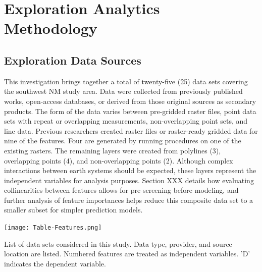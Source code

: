 \chapter{Exploration Analytics Methodology}\label{ch3:expl_methods}

\section{Exploration Data Sources}\label{ch3:expl_data_src}

This investigation brings together a total of twenty-five (25) data sets covering the southwest NM study area. Data were collected from previously published works, open-access databases, or derived from those original sources as secondary products. The form of the data varies between pre-gridded raster files, point data sets with repeat or overlapping measurements, non-overlapping point sets, and line data. Previous researchers created raster files or raster-ready gridded data for nine of the features. Four are generated by running procedures on one of the existing rasters. The remaining layers were created from polylines (3), overlapping points (4), and non-overlapping points (2). Although complex interactions between earth systems should be expected, these layers represent the independent variables for analysis purposes. Section XXX details how evaluating collinearities between features allows for pre-screening before modeling, and further analysis of feature importances helps reduce this composite data set to a smaller subset for simpler prediction models.

\begin{table}[htp]
\centering
\texttt{[image: Table-Features.png]}
\caption[Features considered in this the exploration analytics study]{List of data sets considered in this study. Data type, provider, and source location are listed. Numbered features are treated as independent variables. 'D' indicates the dependent variable.}
\label{tab:features}
\end{table}

